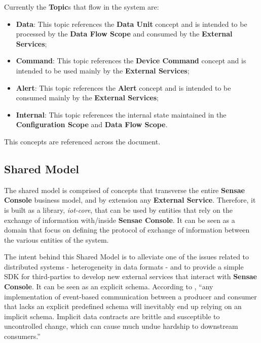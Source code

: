 Currently the \textbf{Topic}s that flow in the system are:

\begin{itemize}
   \item \textbf{Data}: This topic references the \textbf{Data Unit} concept and is intended to be processed by the \textbf{Data Flow Scope} and consumed by the \textbf{External Services};
   \item \textbf{Command}: This topic references the \textbf{Device Command} concept and is intended to be used mainly by the \textbf{External Services};
   \item \textbf{Alert}: This topic references the \textbf{Alert} concept and is intended to be consumed mainly by the \textbf{External Services};
   \item \textbf{Internal}: This topic references the internal state maintained in the \textbf{Configuration Scope} and \textbf{Data Flow Scope}.
\end{itemize}

This concepts are referenced across the document.

\subsection{Shared Model}
\label{subsec:design:domain:shared_model}

The shared model is comprised of concepts that transverse the entire \textbf{Sensae Console} business model, and by extension any \textbf{External Service}. Therefore, it is built as a library, \textit{iot-core}, that can be used by entities that rely on the exchange of information with/inside \textbf{Sensae Console}. It can be seen as a domain that focus on defining the protocol of exchange of information between the various entities of the system.

The intent behind this Shared Model is to alleviate one of the issues related to distributed systems - heterogeneity in data formats \parencite{nadiminti2006distributed} - and to provide a simple \gls{SDK} for third-parties to develop new external services that interact with \textbf{Sensae Console}. It can be seen as an explicit schema. According to \cite{explicitsharedmodel}, ``any implementation of event-based communication between a producer and consumer that lacks an explicit predefined schema will inevitably end up relying on an implicit schema. Implicit data contracts are brittle and susceptible to uncontrolled change, which can cause much undue hardship to downstream consumers.''


